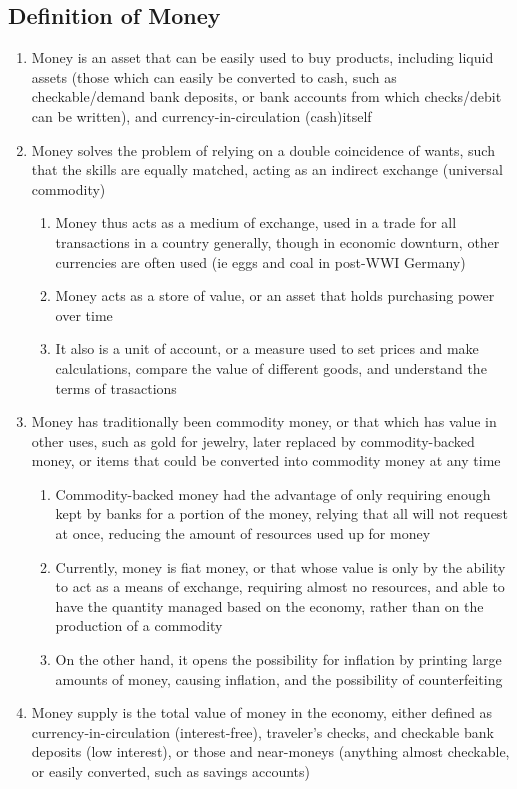 \documentclass[11 pt, twoside]{article}
\begin{document}
\subsection{Definition of Money}
\begin{enumerate}
\item Money is an asset that can be easily used to buy products, including liquid assets (those which can easily be converted to cash, such as checkable/demand bank deposits, or bank accounts from which checks/debit can be written), and currency-in-circulation (cash)itself
\item Money solves the problem of relying on a double coincidence of wants, such that the skills are equally matched, acting as an indirect exchange (universal commodity)
\begin{enumerate}
\item Money thus acts as a medium of exchange, used in a trade for all transactions in a country generally, though in economic downturn, other currencies are often used (ie eggs and coal in post-WWI Germany)
\item Money acts as a store of value, or an asset that holds purchasing power over time
\item It also is a unit of account, or a measure used to set prices and make calculations, compare the value of different goods, and understand the terms of trasactions
\end{enumerate}
\item Money has traditionally been commodity money, or that which has value in other uses, such as gold for jewelry, later replaced by commodity-backed money, or items that could be converted into commodity money at any time
\begin{enumerate}
\item Commodity-backed money had the advantage of only requiring enough kept by banks for a portion of the money, relying that all will not request at once, reducing the amount of resources used up for money
\item Currently, money is fiat money, or that whose value is only by the ability to act as a means of exchange, requiring almost no resources, and able to have the quantity managed based on the economy, rather than on the production of a commodity
\item On the other hand, it opens the possibility for inflation by printing large amounts of money, causing inflation, and the possibility of counterfeiting
\end{enumerate}
\item Money supply is the total value of money in the economy, either defined as currency-in-circulation (interest-free), traveler's checks, and checkable bank deposits (low interest), or those and near-moneys (anything almost checkable, or easily converted, such as savings accounts)

\end{enumerate}
\end{document}
